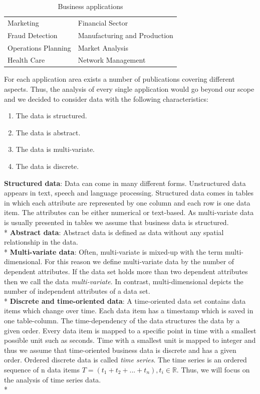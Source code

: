 \begin{table}[H]
	\centering
	\caption[Table 1]{Business applications\cite{Brachman1996,Tegarden1999}}
	\label{businessapplications}
	\begin{tabu}{ll}
	\toprule
	Marketing & Financial Sector \\
	Fraud Detection & Manufacturing and Production \\
	Operations Planning & Market Analysis \\
	Health Care & Network Management\\
	\bottomrule
	\end{tabu}
\end{table}
For each application area exists a number of publications covering different aspects. Thus, the analysis of every single application would go beyond our scope and we decided to consider data with the following characteristics: 
\begin{enumerate}
    \item The data is structured. 
    \item The data is abstract.
    \item The data is multi-variate.
    \item The data is discrete.
\end{enumerate}
\textbf{Structured data}: Data can come in many different forms. Unstructured data appears in text, speech and language processing\cite{Borgo2013}. Structured data comes in tables in which each attribute are represented by one column and each row is one data item. The attributes can be either numerical or text-based. As multi-variate data is usually presented in tables\cite{Borgo2013} we assume that business data is structured.\\*
\textbf{Abstract data}: Abstract data is defined as data without any spatial relationship in the data\cite{Shneiderman1996}. \\*
\textbf{Multi-variate data}: 
Often, multi-variate is mixed-up with the term multi-dimensional. For this reason we define  multi-variate data by the number of dependent attributes. If the data set holds more than two dependent attributes then we call the data \textit{multi-variate}. In contrast, multi-dimensional depicts the number of independent attributes of a data set\cite{Aigner2011}.  \\*
\textbf{Discrete and time-oriented data}: A time-oriented data set contains data items which change over time. Each data item has a timestamp which is saved in one table-column. The time-dependency of the data structures the data by a given order. Every data item is mapped to a specific point in time with a smallest possible unit such as seconds. Time with a smallest unit is mapped to integer\cite{Aigner2011} and thus we assume that time-oriented business data is discrete and has a given order. Ordered discrete data is called \textit{time series}. The time series is an ordered sequence of n data items $T=(t_1+t_2+...+t_n),t_i\in\mathbb{R}$. Thus, we will focus on the analysis of time series data. \\*
